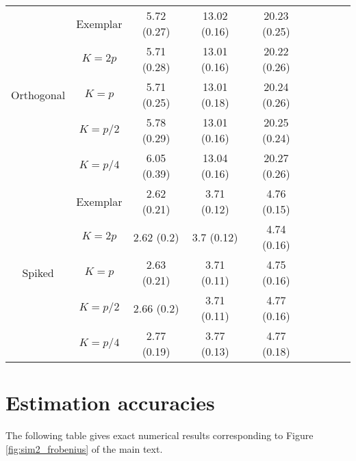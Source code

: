 \documentclass{article}
\begin{document}
\begin{table}[H]
{\begin{tabular}{ccccccccc}
\multirow{5}{*}{Orthogonal} & Exemplar & 5.72 (0.27) & 13.02 (0.16) & 20.23 (0.25) \\
&$K = 2p$    & 5.71 (0.28) & 13.01 (0.16) & 20.22 (0.26) \\
&$K = p$    & 5.71 (0.25) & 13.01 (0.18) & 20.24 (0.26) \\
&$K = p / 2$  & 5.78 (0.29) & 13.01 (0.16) & 20.25 (0.24) \\
&$K = p/4$ & 6.05 (0.39) & 13.04 (0.16) & 20.27 (0.26)\\ \midrule
\multirow{5}{*}{Spiked} &Exemplar & 2.62 (0.21) & 3.71 (0.12) & 4.76 (0.15) \\
&$K = 2p$     & 2.62 (0.2)  & 3.7 (0.12)  & 4.74 (0.16) \\
&$K = p$     & 2.63 (0.21) & 3.71 (0.11) & 4.75 (0.16) \\
&$K = p / 2$   & 2.66 (0.2)  & 3.71 (0.11) & 4.77 (0.16) \\
&$K = p/4$  & 2.77 (0.19) & 3.77 (0.13) & 4.77 (0.18)\\ \bottomrule
\end{tabular}%
}
\end{table}

\section{Estimation accuracies}

The following table gives exact numerical results corresponding to Figure \ref{fig:sim2_frobenius} of the main text.
\end{document}
